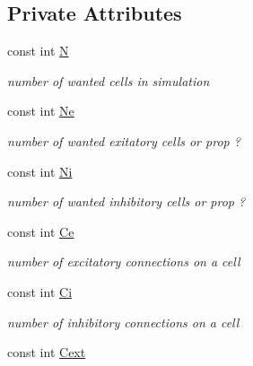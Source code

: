 \subsection*{Private Attributes}
\begin{DoxyCompactItemize}
\item 
\hypertarget{classNetwork_af8658694471fdd0bf6c419f3e8585821}{const int \hyperlink{classNetwork_af8658694471fdd0bf6c419f3e8585821}{N}}\label{classNetwork_af8658694471fdd0bf6c419f3e8585821}

\begin{DoxyCompactList}\small\item\em number of wanted cells in simulation \end{DoxyCompactList}\item 
\hypertarget{classNetwork_a4eabd7361fd4fff9aa07559e98631865}{const int \hyperlink{classNetwork_a4eabd7361fd4fff9aa07559e98631865}{Ne}}\label{classNetwork_a4eabd7361fd4fff9aa07559e98631865}

\begin{DoxyCompactList}\small\item\em number of wanted exitatory cells or prop ? \end{DoxyCompactList}\item 
\hypertarget{classNetwork_ada762bd29fdf868f0adc30fb9f35ea3c}{const int \hyperlink{classNetwork_ada762bd29fdf868f0adc30fb9f35ea3c}{Ni}}\label{classNetwork_ada762bd29fdf868f0adc30fb9f35ea3c}

\begin{DoxyCompactList}\small\item\em number of wanted inhibitory cells or prop ? \end{DoxyCompactList}\item 
\hypertarget{classNetwork_ae5503ee63a63b1eab930d2b53c8535a7}{const int \hyperlink{classNetwork_ae5503ee63a63b1eab930d2b53c8535a7}{Ce}}\label{classNetwork_ae5503ee63a63b1eab930d2b53c8535a7}

\begin{DoxyCompactList}\small\item\em number of excitatory connections on a cell \end{DoxyCompactList}\item 
\hypertarget{classNetwork_abb350a782c8c5ae027cda70b6a3a6421}{const int \hyperlink{classNetwork_abb350a782c8c5ae027cda70b6a3a6421}{Ci}}\label{classNetwork_abb350a782c8c5ae027cda70b6a3a6421}

\begin{DoxyCompactList}\small\item\em number of inhibitory connections on a cell \end{DoxyCompactList}\item 
\hypertarget{classNetwork_a4f238ad2a3c89df9eb7eedae5c306707}{const int \hyperlink{classNetwork_a4f238ad2a3c89df9eb7eedae5c306707}{Cext}}\label{classNetwork_a4f238ad2a3c89df9eb7eedae5c306707}


\end{DoxyCompactItemize}
